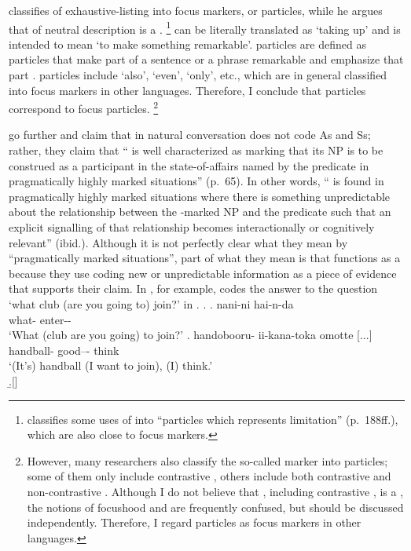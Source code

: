  classifies  of exhaustive-listing into focus markers, or  particles,
while he argues that  of neutral description is a .%
 \footnote{
  classifies some uses of  into ``particles which represents limitation'' (p.~188ff.),
 which are also close to focus markers.
 }
 can be literally translated as `taking up'
and is intended to mean `to make something remarkable'.
 particles are defined as
particles that make part of a sentence or a phrase remarkable and emphasize that part \cite[178]{miyata48}.
 particles include  `also',  `even',
 `only', etc.,
which are in general classified into focus markers in other languages.
Therefore, I conclude that  particles correspond to
focus particles.%
 \footnote{
 However, many researchers also classify the so-called  marker 
  into  particles;
 some of them only include contrastive   \cite{okutsu74,okutsu86,numata86},
 others include both contrastive and non-contrastive 
 \cite{miyata48,suzuki72,teramura81,noda95}.
 Although I do not believe that , including contrastive , is a ,
 the notions of focushood and  are frequently confused,
 but should be discussed independently.
 Therefore, I regard  particles as focus markers
 in other languages.}

 go further and claim that
 in natural conversation does not code As and Ss;
rather, they claim that
`` is well characterized as marking that its NP is to be construed as a participant in the state-of-affairs named by the predicate in pragmatically highly marked situations'' (p.~65).
In other words,
`` is found in pragmatically highly marked situations where
there is something unpredictable about the relationship between
the -marked NP and the predicate such that
an explicit signalling of that relationship becomes interactionally or cognitively relevant'' (ibid.).
Although it is not perfectly clear what they mean by
``pragmatically marked situations'',
part of what they mean is that
 functions as a 
because they use  coding new or unpredictable information
as a piece of evidence that supports their claim.
In \Next[b], for example,
 codes the answer to the question
`what club (are you going to) join?' in \Next[a].
%
\ex.
 \ag. nani-ni hai-n-da \\
      what- enter-- \\
      `What (club are you going) to join?'
 \bg. handobooru- ii-kana-toka omotte [...] \\
      handball- good--- think \\
      `(It's) handball (I want to join), (I) think.' \\
 \b.[]     \hfill{\cite[70]{onoetal00}}


